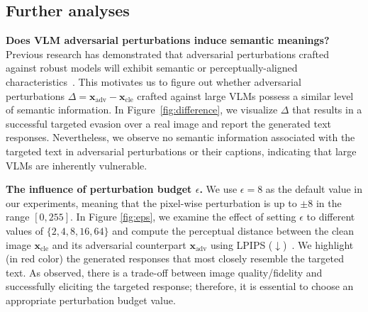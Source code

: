  

\vspace{-0.cm}
\subsection{Further analyses}
\vspace{-0.0cm}
\label{sec:analysis}

\textbf{Does VLM adversarial perturbations induce semantic meanings?} 
Previous research has demonstrated that adversarial perturbations crafted against robust models will exhibit semantic or perceptually-aligned characteristics~\citep{ilyas2019adversarial,pang22score,tao2018attacks}. This motivates us to figure out whether adversarial perturbations $\Delta\!=\!\boldsymbol{x}_{\text{adv}}\!-\!\boldsymbol{x}_{\text{cle}}$ crafted against large VLMs possess a similar level of semantic information. In Figure~\ref{fig:difference}, we visualize $\Delta$ that results in a successful targeted evasion over a real image and report the generated text responses. Nevertheless, we observe no semantic information associated with the targeted text in adversarial perturbations or their captions, indicating that large VLMs are inherently vulnerable.

\textbf{The influence of perturbation budget $\epsilon$.} 
We use $\epsilon=8$ as the default value in our experiments, meaning that the pixel-wise perturbation is up to $\pm 8$ in the range $[0,255]$. In Figure \ref{fig:eps}, we examine the effect of setting $\epsilon$ to different values of $\{2,4,8,16,64\}$ and compute the perceptual distance between the clean image $\boldsymbol{x}_{\text{cle}}$ and its adversarial counterpart $\boldsymbol{x}_{\text{adv}}$ using LPIPS ($\downarrow$)~\citep{zhang2018lpips}. We highlight (in red color) the generated responses that most closely resemble the targeted text. As observed, there is a trade-off between image quality/fidelity and successfully eliciting the targeted response; therefore, it is essential to choose an appropriate perturbation budget value.

